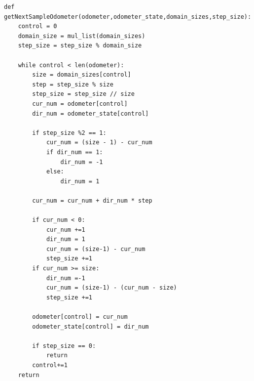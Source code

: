 \documentclass[12pt]{article}
\begin{document}
\begin{lstlisting}
def getNextSampleOdometer(odometer,odometer_state,domain_sizes,step_size):
    control = 0
    domain_size = mul_list(domain_sizes)
    step_size = step_size % domain_size

    while control < len(odometer):
        size = domain_sizes[control]
        step = step_size % size
        step_size = step_size // size
        cur_num = odometer[control]
        dir_num = odometer_state[control]

        if step_size %2 == 1:
            cur_num = (size - 1) - cur_num
            if dir_num == 1:
                dir_num = -1
            else:
                dir_num = 1

        cur_num = cur_num + dir_num * step

        if cur_num < 0:
            cur_num +=1
            dir_num = 1
            cur_num = (size-1) - cur_num
            step_size +=1
        if cur_num >= size:
            dir_num =-1
            cur_num = (size-1) - (cur_num - size)
            step_size +=1

        odometer[control] = cur_num
        odometer_state[control] = dir_num

        if step_size == 0:
            return
        control+=1
    return
\end{lstlisting}
\newpage
\end{document}

